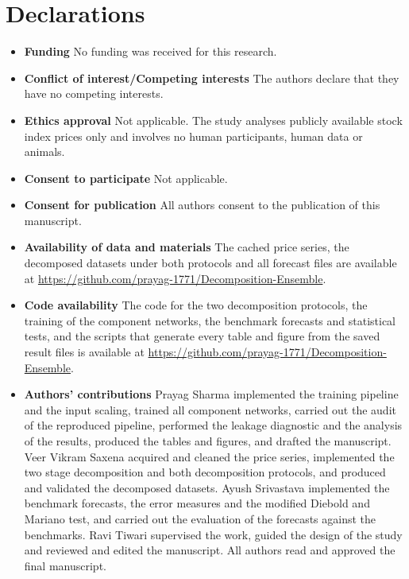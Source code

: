 \documentclass[pdflatex,sn-mathphys-num]{sn-jnl}%
\theoremstyle{thmstyleone}%
\theoremstyle{thmstyletwo}%
\theoremstyle{thmstylethree}%
\begin{document}
\section*{Declarations}

\begin{itemize}
\item \textbf{Funding} \; No funding was received for this research.
\item \textbf{Conflict of interest/Competing interests} \; The authors declare that
they have no competing interests.
\item \textbf{Ethics approval} \; Not applicable. The study analyses publicly available
stock index prices only and involves no human participants, human data or animals.
\item \textbf{Consent to participate} \; Not applicable.
\item \textbf{Consent for publication} \; All authors consent to the publication of this
manuscript.
\item \textbf{Availability of data and materials} \; The cached price series, the
decomposed datasets under both protocols and all forecast files are available at
\url{https://github.com/prayag-1771/Decomposition-Ensemble}.
\item \textbf{Code availability} \; The code for the two decomposition protocols, the
training of the component networks, the benchmark forecasts and statistical tests, and
the scripts that generate every table and figure from the saved result files is
available at \url{https://github.com/prayag-1771/Decomposition-Ensemble}.
\item \textbf{Authors' contributions} \; Prayag Sharma implemented the training
pipeline and the input scaling, trained all component networks, carried out the audit
of the reproduced pipeline, performed the leakage diagnostic and the analysis of the
results, produced the tables and figures, and drafted the manuscript. Veer Vikram
Saxena acquired and cleaned the price series, implemented the two stage decomposition
and both decomposition protocols, and produced and validated the decomposed datasets.
Ayush Srivastava implemented the benchmark forecasts, the error measures and the
modified Diebold and Mariano test, and carried out the evaluation of the forecasts
against the benchmarks. Ravi Tiwari supervised the work, guided the design of the study
and reviewed and edited the manuscript. All authors read and approved the final
manuscript.
\end{itemize}
\end{document}
